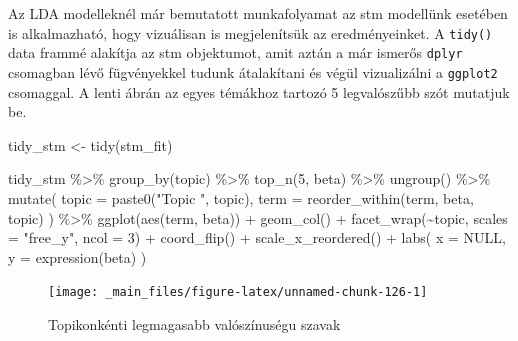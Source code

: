 \documentclass[
]{book}
\newenvironment{Shaded}{\begin{snugshade}}{\end{snugshade}}
\newcommand{\AttributeTok}[1]{\textcolor[rgb]{0.77,0.63,0.00}{#1}}
\newcommand{\ConstantTok}[1]{\textcolor[rgb]{0.00,0.00,0.00}{#1}}
\newcommand{\DecValTok}[1]{\textcolor[rgb]{0.00,0.00,0.81}{#1}}
\newcommand{\FunctionTok}[1]{\textcolor[rgb]{0.00,0.00,0.00}{#1}}
\newcommand{\NormalTok}[1]{#1}
\newcommand{\OtherTok}[1]{\textcolor[rgb]{0.56,0.35,0.01}{#1}}
\newcommand{\SpecialCharTok}[1]{\textcolor[rgb]{0.00,0.00,0.00}{#1}}
\newcommand{\StringTok}[1]{\textcolor[rgb]{0.31,0.60,0.02}{#1}}
\begin{document}
Az LDA modelleknél már bemutatott munkafolyamat az stm modellünk
esetében is alkalmazható, hogy vizuálisan is megjelenítsük az
eredményeinket. A \texttt{tidy()} data frammé alakítja az stm
objektumot, amit aztán a már ismerős \texttt{dplyr} csomagban lévő
fügvényekkel tudunk átalakítani és végül vizualizálni a \texttt{ggplot2}
csomaggal. A lenti ábrán az egyes témákhoz tartozó 5 legvalószűbb szót
mutatjuk be.

\begin{Shaded}
\begin{Highlighting}[]
\NormalTok{tidy\_stm }\OtherTok{\textless{}{-}} \FunctionTok{tidy}\NormalTok{(stm\_fit)}
\end{Highlighting}
\end{Shaded}

\begin{Shaded}
\begin{Highlighting}[]
\NormalTok{tidy\_stm }\SpecialCharTok{\%\textgreater{}\%}
  \FunctionTok{group\_by}\NormalTok{(topic) }\SpecialCharTok{\%\textgreater{}\%}
  \FunctionTok{top\_n}\NormalTok{(}\DecValTok{5}\NormalTok{, beta) }\SpecialCharTok{\%\textgreater{}\%}
  \FunctionTok{ungroup}\NormalTok{() }\SpecialCharTok{\%\textgreater{}\%}
  \FunctionTok{mutate}\NormalTok{(}
    \AttributeTok{topic =} \FunctionTok{paste0}\NormalTok{(}\StringTok{"Topic "}\NormalTok{, topic),}
    \AttributeTok{term =} \FunctionTok{reorder\_within}\NormalTok{(term, beta, topic)}
\NormalTok{  ) }\SpecialCharTok{\%\textgreater{}\%}
  \FunctionTok{ggplot}\NormalTok{(}\FunctionTok{aes}\NormalTok{(term, beta)) }\SpecialCharTok{+}
  \FunctionTok{geom\_col}\NormalTok{() }\SpecialCharTok{+}
  \FunctionTok{facet\_wrap}\NormalTok{(}\SpecialCharTok{\textasciitilde{}}\NormalTok{topic, }\AttributeTok{scales =} \StringTok{"free\_y"}\NormalTok{, }\AttributeTok{ncol =} \DecValTok{3}\NormalTok{) }\SpecialCharTok{+}
  \FunctionTok{coord\_flip}\NormalTok{() }\SpecialCharTok{+}
  \FunctionTok{scale\_x\_reordered}\NormalTok{() }\SpecialCharTok{+}
  \FunctionTok{labs}\NormalTok{(}
    \AttributeTok{x =} \ConstantTok{NULL}\NormalTok{,}
    \AttributeTok{y =} \FunctionTok{expression}\NormalTok{(beta)}
\NormalTok{  )}
\end{Highlighting}
\end{Shaded}

\begin{figure}

{\centering \texttt{[image: \_main\_files/figure-latex/unnamed-chunk-126-1]} 

}

\caption{Topikonkénti legmagasabb valószínuségu szavak}\label{fig:unnamed-chunk-126}
\end{figure}
\end{document}
